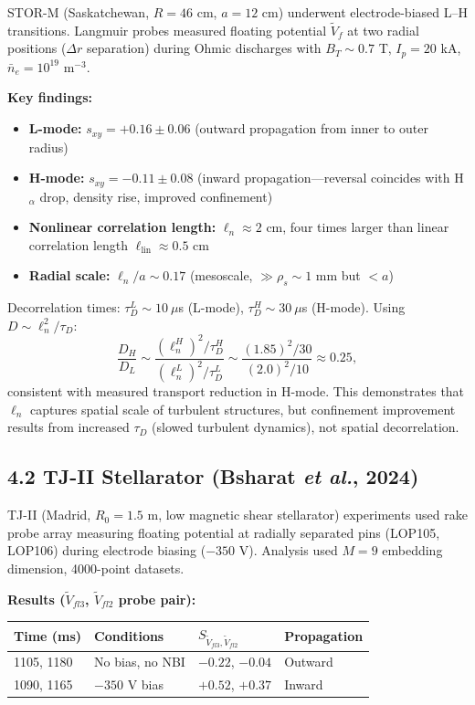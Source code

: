 \documentclass[11pt]{article}
\begin{document}
STOR-M (Saskatchewan, $R=46$ cm, $a=12$ cm) underwent electrode-biased L–H transitions. Langmuir probes measured floating potential $\tilde{V}_f$ at two radial positions ($\Delta r$ separation) during Ohmic discharges with $B_T \sim 0.7$ T, $I_p=20$ kA, $\bar{n}_e=10^{19}$ m$^{-3}$.

\textbf{Key findings:}
\begin{itemize}
\item \textbf{L-mode:} $s_{xy}=+0.16\pm0.06$ (outward propagation from inner to outer radius)
\item \textbf{H-mode:} $s_{xy}=-0.11\pm0.08$ (inward propagation—reversal coincides with H$_\alpha$ drop, density rise, improved confinement)
\item \textbf{Nonlinear correlation length:} $\ell_n \approx 2$ cm, four times larger than linear correlation length $\ell_{\text{lin}} \approx 0.5$ cm
\item \textbf{Radial scale:} $\ell_n/a \sim 0.17$ (mesoscale, $\gg \rho_s \sim 1$ mm but $< a$)
\end{itemize}

Decorrelation times: $\tau_D^L \sim 10~\mu$s (L-mode), $\tau_D^H \sim 30~\mu$s (H-mode). Using $D \sim \ell_n^2/\tau_D$:
\[
\frac{D_H}{D_L} \sim \frac{(\ell_n^H)^2/\tau_D^H}{(\ell_n^L)^2/\tau_D^L} \sim \frac{(1.85)^2/30}{(2.0)^2/10} \approx 0.25,
\]
consistent with measured transport reduction in H-mode. This demonstrates that $\ell_n$ captures spatial scale of turbulent structures, but confinement improvement results from increased $\tau_D$ (slowed turbulent dynamics), not spatial decorrelation.

\subsection*{4.2 TJ-II Stellarator (Bsharat \textit{et al.}, 2024)}

TJ-II (Madrid, $R_0=1.5$ m, low magnetic shear stellarator) experiments used rake probe array measuring floating potential at radially separated pins (LOP105, LOP106) during electrode biasing ($-350$ V). Analysis used $M=9$ embedding dimension, 4000-point datasets.

\textbf{Results ($\tilde{V}_{fl3}$, $\tilde{V}_{fl2}$ probe pair):}

\begin{center}
\begin{tabular}{llll}
\hline
Time (ms) & Conditions & $S_{\tilde{V}_{fl3},\tilde{V}_{fl2}}$ & Propagation \\
\hline
1105, 1180 & No bias, no NBI & $-0.22$, $-0.04$ & Outward \\
1090, 1165 & $-350$ V bias & $+0.52$, $+0.37$ & Inward \\
\hline
\end{tabular}
\end{center}
\end{document}
